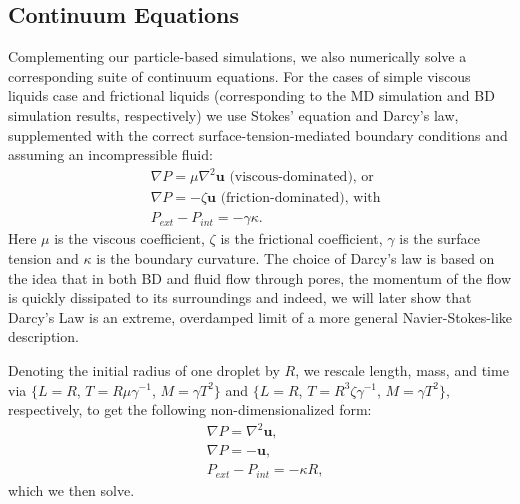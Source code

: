 \documentclass[%
reprint,
amsmath,amssymb,
aps,
]{revtex4-2}
\begin{document}
	\subsection{Continuum Equations}
	Complementing our particle-based simulations, we also numerically solve a corresponding suite of continuum equations. For the cases of simple viscous liquids case and frictional liquids (corresponding to the MD simulation and BD simulation results, respectively) we use Stokes' equation and Darcy's law, supplemented with the correct surface-tension-mediated boundary conditions and assuming an incompressible fluid:
	\begin{align}
		&\nabla P = \mu\nabla^2\textbf{u} \textrm{ (viscous-dominated), or} \\
		&\nabla P = -\zeta\textbf{u} \textrm{ (friction-dominated), with} \\
		&P_{ext}-P_{int} = -\gamma\kappa. 
	\end{align}
	Here $\mu$ is the viscous coefficient, $\zeta$ is the frictional coefficient, $\gamma$ is the surface tension and $\kappa$ is the boundary curvature. The choice of Darcy's law is based on the idea that in both BD and fluid flow through pores, the momentum of the flow is quickly dissipated to its surroundings and indeed, we will later show that Darcy’s Law is an extreme, overdamped limit of a more general Navier-Stokes-like description.
	
	Denoting the initial radius of one droplet by $R$, we rescale length, mass, and time via $\{L=R$, $T = R\mu\gamma^{-1}$, $M = \gamma T^2\}$ and $\{L=R$, $T = R^3\zeta\gamma^{-1}$, $M=\gamma T^2\}$, respectively, to get the following non-dimensionalized form:
	\begin{align}
		&\nabla P = \nabla^2\textbf{u}, \label{equ:stokes}\\
		&\nabla P = -\textbf{u}, \label{equ:darcy}\\
		&P_{ext}-P_{int} = -\kappa R,
	\end{align}
	which we then solve. 
	
\end{document}

